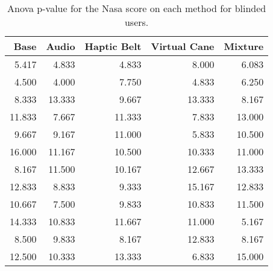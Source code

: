 
\begin{table}[!htb]
\centering
\caption{Anova p-value for the Nasa score on each method for blinded users.}
\label{tab:anova_nasa}
\begin{tabular}{rrrrr}
\toprule
  Base &  Audio &  Haptic Belt &  Virtual Cane &  Mixture \\
\midrule
 5.417 &  4.833 &        4.833 &         8.000 &    6.083 \\
 4.500 &  4.000 &        7.750 &         4.833 &    6.250 \\
 8.333 & 13.333 &        9.667 &        13.333 &    8.167 \\
11.833 &  7.667 &       11.333 &         7.833 &   13.000 \\
 9.667 &  9.167 &       11.000 &         5.833 &   10.500 \\
16.000 & 11.167 &       10.500 &        10.333 &   11.000 \\
 8.167 & 11.500 &       10.167 &        12.667 &   13.333 \\
12.833 &  8.833 &        9.333 &        15.167 &   12.833 \\
10.667 &  7.500 &        9.833 &        10.833 &   11.500 \\
14.333 & 10.833 &       11.667 &        11.000 &    5.167 \\
 8.500 &  9.833 &        8.167 &        12.833 &    8.167 \\
12.500 & 10.333 &       13.333 &         6.833 &   15.000 \\
\bottomrule
\end{tabular}
\end{table}

